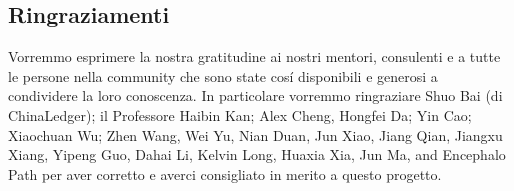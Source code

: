 \documentclass[UTF8,nofonts]{article}
\begin{document}
\begin{multicols}{2}
\section{ Ringraziamenti}
Vorremmo esprimere la nostra gratitudine ai nostri mentori, consulenti e a tutte le persone nella community che sono state cos\'i disponibili e generosi a condividere la loro conoscenza. In particolare vorremmo ringraziare Shuo Bai (di ChinaLedger); il Professore Haibin Kan; Alex Cheng, Hongfei Da; Yin Cao; Xiaochuan Wu; Zhen Wang, Wei Yu, Nian Duan, Jun Xiao, Jiang Qian, Jiangxu Xiang, Yipeng Guo, Dahai Li, Kelvin Long, Huaxia Xia, Jun Ma, and Encephalo Path per aver corretto e averci consigliato in merito a questo progetto.


\end{multicols}
\begin{appendices}

\end{appendices}
\end{document}
